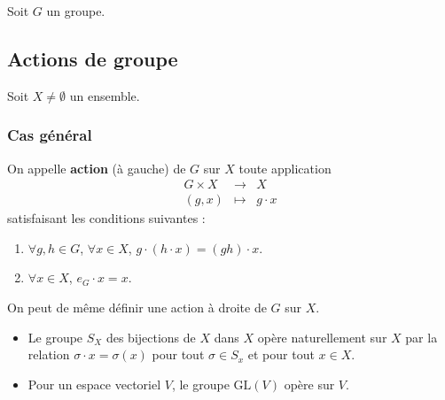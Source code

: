 




  Soit $G$ un groupe.

  \subsection{Actions de groupe}

  Soit $X \neq \emptyset$ un ensemble.

  \subsubsection{Cas général}


  \begin{definition}
    On appelle \textbf{action} (à gauche) de $G$ sur $X$ toute application
    \[
    \begin{array}{ccc}
      G \times X &\rightarrow& X \\
      (g, x) &\mapsto& g \cdot x
    \end{array}
    \]
    satisfaisant les conditions suivantes :
    \begin{enumerate}[label=(\roman*)]
      \item $\forall g, h \in G$, $\forall x \in X$, $g \cdot (h \cdot x) = (gh) \cdot x$.
      \item $\forall x \in X$, $e_G \cdot x = x$.
    \end{enumerate}
  \end{definition}

  \begin{remark}
    On peut de même définir une action à droite de $G$ sur $X$.
  \end{remark}

  \begin{example}
    \begin{itemize}
      \item Le groupe $S_X$ des bijections de $X$ dans $X$ opère naturellement sur $X$ par la relation $\sigma \cdot x = \sigma(x)$ pour tout $\sigma \in S_x$ et pour tout $x \in X$.
      \item Pour un espace vectoriel $V$, le groupe $\mathrm{GL}(V)$ opère sur $V$.
    \end{itemize}
  \end{example}

